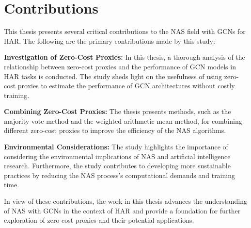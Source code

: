 \section{Contributions}

This thesis presents several critical contributions to the \gls{NAS} field with \glspl{GCN} for \gls{HAR}. The following are the primary contributions made by this study:

\textbf{Investigation of Zero-Cost Proxies:} In this thesis, a thorough analysis of the relationship between zero-cost proxies and the performance of \gls{GCN} models in \gls{HAR} tasks is conducted. The study sheds light on the usefulness of using zero-cost proxies to estimate the performance of \gls{GCN} architectures without costly training. 

\textbf{Combining Zero-Cost Proxies:} The thesis presents methods, such as the majority vote method and the weighted arithmetic mean method, for combining different zero-cost proxies to improve the efficiency of the \gls{NAS} algorithms. 

\textbf{Environmental Considerations:} The study highlights the importance of considering the environmental implications of \gls{NAS} and artificial intelligence research. Furthermore, the study contributes to developing more sustainable practices by reducing the \gls{NAS} process's computational demands and training time.

In view of these contributions, the work in this thesis advances the understanding of \gls{NAS} with \glspl{GCN} in the context of \gls{HAR} and provide a foundation for further exploration of zero-cost proxies and their potential applications.
